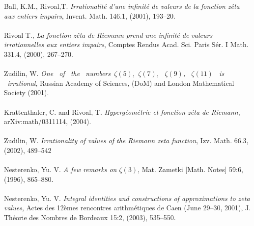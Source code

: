 \documentclass[12pt]{article}
\begin{document}
\big[3\big] Ball, K.M., Rivoal,T. {\it Irrationalité d’une infinité de valeurs de la fonction zêta aux entiers impairs}, Invent. Math. 146.1, (2001), 193–20. 
\\\\
\big[4\big] Rivoal T., {\it La fonction zêta de Riemann prend une infinité de valeurs irrationnelles aux entiers impairs}, Comptes Rendus Acad. Sci. Paris Sér. I Math. 331.4, (2000), 267–270. 
\\\\
\big[5\big] Zudilin, W. {\it One \ of \ the \ numbers\  $\zeta(5)$,\ $\zeta(7)$, \ $\zeta(9)$, \ $\zeta(11)$ \ is \ irrational}, Russian Academy of Sciences, (DoM) and London Mathematical Society (2001).
\\\\
\big[6\big] Krattenthaler, C. and Rivoal, T. {\it Hyperg\'eom\'etrie et fonction z\'eta de Riemann}, arXiv:math/0311114, (2004). \\\\ 
\big[7\big] Zudilin, W. {\it Irrationality of values of the Riemann zeta function}, Izv. Math. 66.3, (2002), 489–542\\\\
\big[8\big] Nesterenko, Yu. V. {\it A few remarks on $\zeta(3)$}, Mat. Zametki [Math. Notes] 59:6, (1996), 865--880. \\\\
\big[9\big] Nesterenko, Yu. V. {\it Integral identities and constructions of approximations to zeta values}, Actes des 12èmes rencontres arithmétiques de Caen (June 29--30, 2001), J. Théorie des Nombres de Bordeaux 15:2, (2003), 535--550. \\\\
\end{document}

